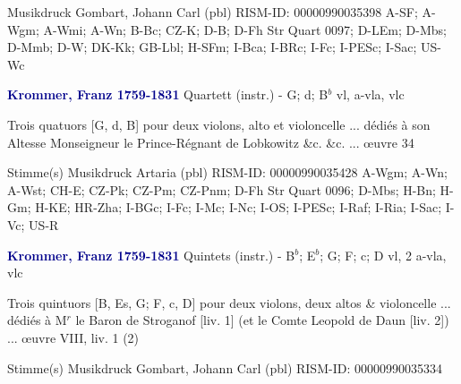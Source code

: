\documentclass[twocolumn]{book}
\begin{document}
\newline Musikdruck
\newline Gombart, Johann Carl  (pbl)
\newline RISM-ID: 00000990035398
\newline A-SF; A-Wgm; A-Wmi; A-Wn; B-Bc; CZ-K; D-B; D-Fh  Str Quart 0097; D-LEm; D-Mbs; D-Mmb; D-W; DK-Kk; GB-Lbl; H-SFm; I-Bca; I-BRc; I-Fc; I-PESc; I-Sac; US-Wc
\newline \par \vspace{7pt} \textcolor{darkblue}{\textbf{Krommer, Franz  1759-1831}}
\newline Quartett (instr.) - G; d; B$^b$
 vl, a-vla, vlc
\newline \begin{itshape}Trois quatuors [G, d, B] pour deux violons, alto et violoncelle ... dédiés à son Altesse Monseigneur le Prince-Régnant de Lobkowitz \&c. \&c. ... œuvre 34\end{itshape} 
\newline \textcolor{darkblue}{}  Stimme(s)
\newline Musikdruck
\newline Artaria  (pbl)
\newline RISM-ID: 00000990035428
\newline A-Wgm; A-Wn; A-Wst; CH-E; CZ-Pk; CZ-Pm; CZ-Pnm; D-Fh  Str Quart 0096; D-Mbs; H-Bn; H-Gm; H-KE; HR-Zha; I-BGc; I-Fc; I-Mc; I-Nc; I-OS; I-PESc; I-Raf; I-Ria; I-Sac; I-Vc; US-R
\newline \par \vspace{7pt} \textcolor{darkblue}{\textbf{Krommer, Franz  1759-1831}}
\newline Quintets (instr.) - B$^b$; E$^b$; G; F; c; D
 vl, 2 a-vla, vlc
\newline \begin{itshape}Trois quintuors [B, Es, G; F, c, D] pour deux violons, deux altos \& violoncelle ... dédiés à M$^r$ le Baron de Stroganof [liv. 1] (et le Comte Leopold de Daun [liv. 2]) ... œuvre VIII, liv. 1 (2)\end{itshape} 
\newline \textcolor{darkblue}{}  Stimme(s)
\newline Musikdruck
\newline Gombart, Johann Carl  (pbl)
\newline RISM-ID: 00000990035334
\end{document}
